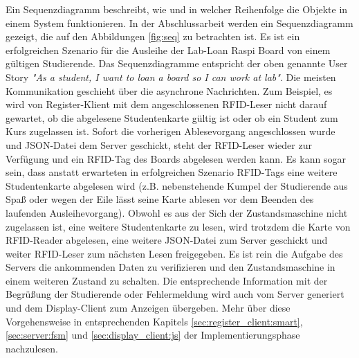 Ein Sequenzdiagramm beschreibt, wie und in welcher Reihenfolge die Objekte in einem System funktionieren. In der Abschlussarbeit werden ein Sequenzdiagramm gezeigt, die auf den Abbildungen \ref{fig:seq} zu betrachten ist. Es ist ein erfolgreichen Szenario für die Ausleihe der Lab-Loan Raspi Board von einem gültigen Studierende. Das Sequenzdiagramme entspricht der oben genannte User Story \textit{"As a student, I want to loan a board so I can work at lab"}. Die meisten Kommunikation geschieht über die asynchrone Nachrichten. Zum Beispiel, es wird von Register-Klient mit dem angeschlossenen RFID-Leser nicht darauf gewartet, ob die abgelesene Studentenkarte gültig ist oder ob ein Student zum Kurs zugelassen ist. Sofort die vorherigen Ablesevorgang angeschlossen wurde und JSON-Datei dem Server geschickt, steht der RFID-Leser wieder zur Verfügung und ein RFID-Tag des Boards abgelesen werden kann. Es kann sogar sein, dass anstatt erwarteten in erfolgreichen Szenario RFID-Tags eine weitere Studentenkarte abgelesen wird (z.B. nebenstehende Kumpel der Studierende aus Spaß oder wegen der Eile lässt seine Karte ablesen vor dem Beenden des laufenden Ausleihevorgang). Obwohl es aus der Sich der Zustandsmaschine nicht zugelassen ist, eine weitere Studentenkarte zu lesen, wird trotzdem die Karte von RFID-Reader abgelesen, eine weitere JSON-Datei zum Server geschickt und weiter RFID-Leser zum nächsten Lesen freigegeben. Es ist rein die Aufgabe des Servers die ankommenden Daten zu verifizieren und den Zustandsmaschine in einem weiteren Zustand zu schalten. Die entsprechende Information mit der Begrüßung der Studierende oder Fehlermeldung wird auch vom Server generiert und dem Display-Client zum Anzeigen übergeben. Mehr über diese Vorgehensweise in entsprechenden Kapitels \ref{sec:register_client:smart}, \ref{sec:server:fsm} und \ref*{sec:display_client:js} der Implementierungsphase nachzulesen. 

